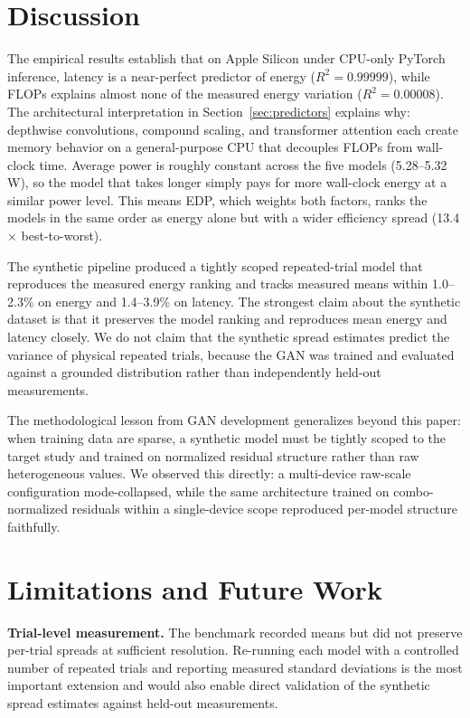 \documentclass[conference]{IEEEtran}
\begin{document}
\section{Discussion}
The empirical results establish that on Apple Silicon under CPU-only PyTorch
inference, latency is a near-perfect predictor of energy ($R^2 = 0.99999$),
while FLOPs explains almost none of the measured energy variation ($R^2 = 0.00008$). The architectural
interpretation in Section~\ref{sec:predictors} explains why: depthwise
convolutions, compound scaling, and transformer attention each create memory
behavior on a general-purpose CPU that decouples FLOPs from wall-clock time.
Average power is roughly constant across the five models (5.28--5.32 W), so
the model that takes longer simply pays for more wall-clock energy at a
similar power level. This means EDP, which weights both factors, ranks the
models in the same order as energy alone but with a wider efficiency spread
(13.4$\times$ best-to-worst).

The synthetic pipeline produced a tightly scoped repeated-trial model that
reproduces the measured energy ranking and tracks measured means within
1.0--2.3\% on energy and 1.4--3.9\% on latency. The strongest claim about
the synthetic dataset is that it preserves the model ranking and reproduces
mean energy and latency closely. We do not claim that the synthetic spread
estimates predict the variance of physical repeated trials, because the GAN
was trained and evaluated against a grounded distribution rather than
independently held-out measurements.

The methodological lesson from GAN development generalizes beyond this paper:
when training data are sparse, a synthetic model must be tightly scoped to
the target study and trained on normalized residual structure rather than
raw heterogeneous values. We observed this directly: a multi-device
raw-scale configuration mode-collapsed, while the same architecture trained
on combo-normalized residuals within a single-device scope reproduced
per-model structure faithfully.

\section{Limitations and Future Work}
\label{sec:limitations}
\textbf{Trial-level measurement.} The benchmark recorded means but did not
preserve per-trial spreads at sufficient resolution. Re-running each model
with a controlled number of repeated trials and reporting measured standard
deviations is the most important extension and would also enable direct
validation of the synthetic spread estimates against held-out measurements.
\end{document}
